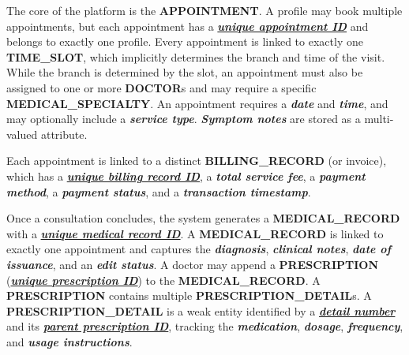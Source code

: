 \begin{sloppypar}
\par The core of the platform is the \textbf{APPOINTMENT}. A profile may book multiple appointments, but each appointment has a \textbf{\textit{\uline{unique appointment ID}}} and belongs to exactly one profile. Every appointment is linked to exactly one \textbf{TIME\_SLOT}, which implicitly determines the branch and time of the visit. While the branch is determined by the slot, an appointment must also be assigned to one or more \textbf{DOCTOR}s and may require a specific \textbf{MEDICAL\_SPECIALTY}. An appointment requires a \textbf{\textit{date}} and \textbf{\textit{time}}, and may optionally include a \textbf{\textit{service type}}. \textbf{\textit{Symptom notes}} are stored as a multi-valued attribute.

\par Each appointment is linked to a distinct \textbf{BILLING\_RECORD} (or invoice), which has a \textbf{\textit{\uline{unique billing record ID}}}, a \textbf{\textit{total service fee}}, a \textbf{\textit{payment method}}, a \textbf{\textit{payment status}}, and a \textbf{\textit{transaction timestamp}}.

\par Once a consultation concludes, the system generates a \textbf{MEDICAL\_RECORD} with a \textbf{\textit{\uline{unique medical record ID}}}. A \textbf{MEDICAL\_RECORD} is linked to exactly one appointment and captures the \textbf{\textit{diagnosis}}, \textbf{\textit{clinical notes}}, \textbf{\textit{date of issuance}}, and an \textbf{\textit{edit status}}. A doctor may append a \textbf{PRESCRIPTION} (\textbf{\textit{\uline{unique prescription ID}}}) to the \textbf{MEDICAL\_RECORD}. A \textbf{PRESCRIPTION} contains multiple \textbf{PRESCRIPTION\_DETAIL}s. A \textbf{PRESCRIPTION\_DETAIL} is a weak entity identified by a \textbf{\textit{\uline{detail number}}} and its \textbf{\textit{\uline{parent prescription ID}}}, tracking the \textbf{\textit{medication}}, \textbf{\textit{dosage}}, \textbf{\textit{frequency}}, and \textbf{\textit{usage instructions}}.
\end{sloppypar}


